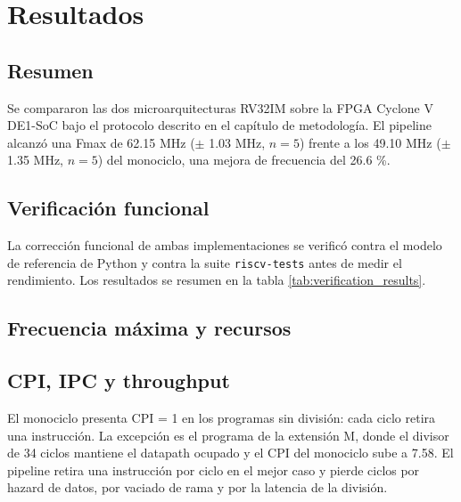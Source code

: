 \chapter{Resultados}

\section{Resumen}

Se compararon las dos microarquitecturas RV32IM sobre la FPGA Cyclone V DE1-SoC bajo el protocolo descrito en el capítulo de metodología. El pipeline alcanzó una Fmax de 62.15 MHz ($\pm$ 1.03 MHz, $n = 5$) frente a los 49.10 MHz ($\pm$ 1.35 MHz, $n = 5$) del monociclo, una mejora de frecuencia del 26.6 \%.

\section{Verificación funcional}

La corrección funcional de ambas implementaciones se verificó contra el modelo de referencia de Python y contra la suite \texttt{riscv-tests} antes de medir el rendimiento. Los resultados se resumen en la tabla \ref{tab:verification_results}.



\section{Frecuencia máxima y recursos}







\section{CPI, IPC y throughput}



El monociclo presenta CPI = 1 en los programas sin división: cada ciclo retira una instrucción. La excepción es el programa de la extensión M, donde el divisor de 34 ciclos mantiene el datapath ocupado y el CPI del monociclo sube a 7.58. El pipeline retira una instrucción por ciclo en el mejor caso y pierde ciclos por hazard de datos, por vaciado de rama y por la latencia de la división.

